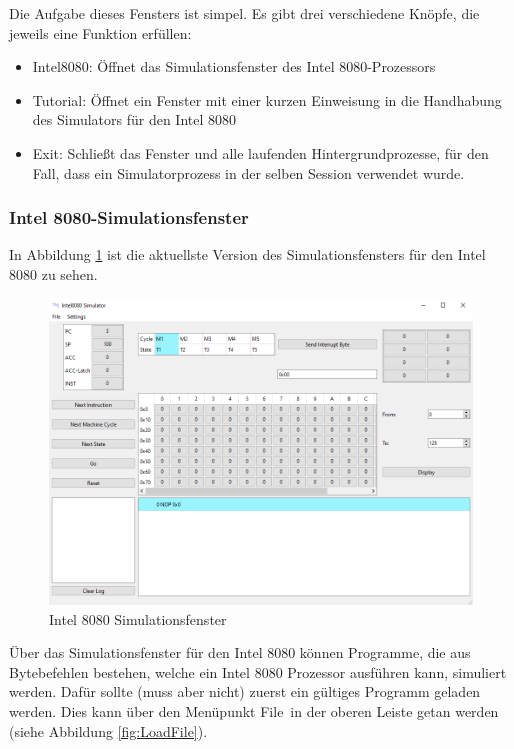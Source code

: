 \documentclass[12pt]{article}
\newcommand{\imgSpaceBefore}{\vspace{10pt}}
\begin{document}
\noindent
Die Aufgabe dieses Fensters ist simpel. Es gibt drei verschiedene Knöpfe, die jeweils eine Funktion erfüllen:
\begin{itemize}
	\item Intel8080: Öffnet das Simulationsfenster des Intel 8080-Prozessors
	\item Tutorial: Öffnet ein Fenster mit einer kurzen Einweisung in die Handhabung des Simulators für den Intel 8080
	\item Exit: Schließt das Fenster und alle laufenden Hintergrundprozesse, für den Fall, dass ein Simulatorprozess in der selben Session verwendet wurde.
\end{itemize}

\subsubsection{Intel 8080-Simulationsfenster}
In Abbildung \ref{fig:I8080MW} ist die aktuellste Version des Simulationsfensters für den Intel 8080 zu sehen.\imgSpaceBefore

\begin{figure}[H]
\centering
\includegraphics[width=15cm]{bilder/Intel8080_MainWindow}
\caption{Intel 8080 Simulationsfenster}
\label{fig:I8080MW}
\end{figure}

\noindent
Über das Simulationsfenster für den Intel 8080 können Programme, die aus Bytebefehlen bestehen, welche ein Intel 8080 Prozessor ausführen kann, simuliert werden. Dafür sollte (muss aber nicht) zuerst ein gültiges Programm geladen werden. Dies kann über den Menüpunkt \glqq File\grqq\ in der oberen Leiste getan werden (siehe Abbildung \ref{fig:LoadFile}).\imgSpaceBefore
\end{document}
